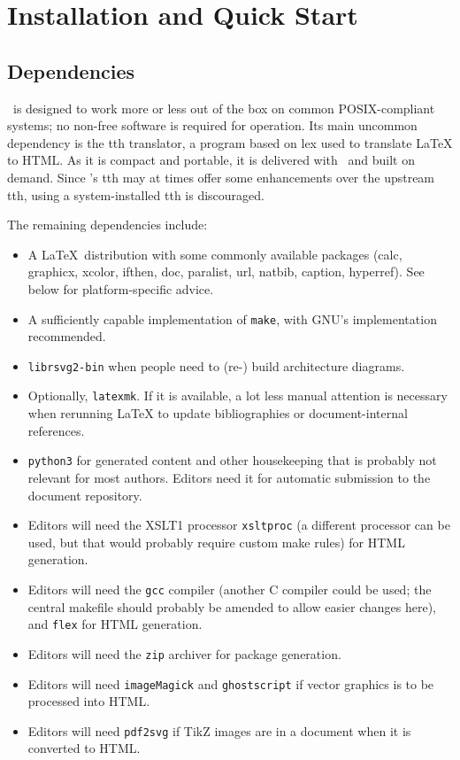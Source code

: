 \documentclass[11pt,a4paper]{ivoa}
\begin{document}
\section{Installation and Quick Start}
\label{sect:quick}

\subsection{Dependencies}

\ivoatex\ is designed to work more or less out of the box on common
POSIX-compliant systems; no non-free software is required for operation.
Its main uncommon dependency is the tth translator,
a program based on lex used to translate LaTeX
to HTML.  As it is compact and portable, it is delivered with
\ivoatex~and built on demand.
Since \ivoatex's tth may at times offer
some enhancements over the upstream tth, using a system-installed tth is
discouraged.

The remaining dependencies include:

\begin{itemize}
\item A \LaTeX\ distribution with some commonly available packages (calc,
graphicx, xcolor, ifthen, doc, paralist, url, natbib, caption,
hyperref).  See below for platform-specific advice.
\item A sufficiently capable implementation of \texttt{make}, with GNU's
implementation recommended.
\item \texttt{librsvg2-bin} when people need to (re-) build architecture
diagrams.
\item Optionally, \texttt{latexmk}.  If it is available, a lot less
manual attention is necessary when rerunning LaTeX to update
bibliographies or document-internal references.
\item \texttt{python3} for  generated content and other housekeeping
that is probably not relevant for most authors.  Editors need it for
automatic submission to the document repository.
\item Editors will need the XSLT1 processor
\texttt{xsltproc} (a different processor can
be used, but that would probably require custom make rules) for HTML
generation.
\item Editors will need the
\texttt{gcc} compiler (another C compiler could be used; the
central makefile should probably be amended to allow easier changes
here), and \texttt{flex} for HTML generation.
\item Editors will need the \texttt{zip} archiver for package generation.
\item Editors will need \texttt{imageMagick} and \texttt{ghostscript} if
vector graphics is to be processed into HTML.
\item Editors will need \texttt{pdf2svg} if TikZ images are in a
document when it is converted to HTML.
\end{itemize}
\end{document}
